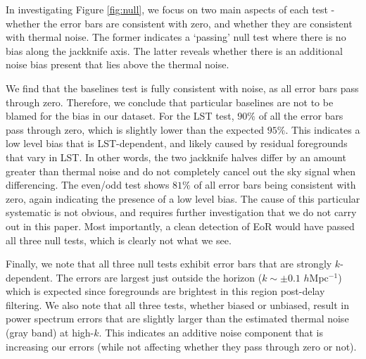 \documentclass[preprint2,numberedappendix,tighten]{aastex6}  %
\begin{document}

In investigating Figure \ref{fig:null}, we focus on two main aspects of each test - whether the error bars are consistent with zero, and whether they are consistent with thermal noise. The former indicates a `passing' null test where there is no bias along the jackknife axis. The latter reveals whether there is an additional noise bias present that lies above the thermal noise.

We find that the baselines test is fully consistent with noise, as all error bars pass through zero. Therefore, we conclude that particular baselines are not to be blamed for the bias in our dataset. For the LST test, $90\%$ of all the error bars pass through zero, which is slightly lower than the expected $95\%$. This indicates a low level bias that is LST-dependent, and likely caused by residual foregrounds that vary in LST. In other words, the two jackknife halves differ by an amount greater than thermal noise and do not completely cancel out the sky signal when differencing. The even/odd test shows $81\%$ of all error bars being consistent with zero, again indicating the presence of a low level bias. The cause of this particular systematic is not obvious, and requires further investigation that we do not carry out in this paper. Most importantly, a clean detection of EoR would have passed all three null tests, which is clearly not what we see.

Finally, we note that all three null tests exhibit error bars that are strongly $k$-dependent. The errors are largest just outside the horizon ($k\sim\pm 0.1$ $h$Mpc$^{-1}$) which is expected since foregrounds are brightest in this region post-delay filtering. We also note that all three tests, whether biased or unbiased, result in power spectrum errors that are slightly larger than the estimated thermal noise (gray band) at high-$k$. This indicates an additive noise component that is increasing our errors (while not affecting whether they pass through zero or not). 
\end{document}
